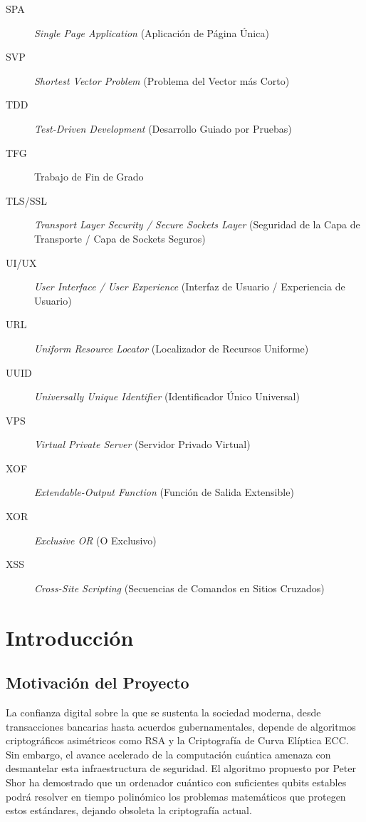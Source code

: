 \documentclass[11pt, a4paper]{report}
\theoremstyle{definition}
\begin{document}
\begin{description}
    \item[SPA] \textit{Single Page Application} (Aplicación de Página Única)
    \item[SVP] \textit{Shortest Vector Problem} (Problema del Vector más Corto)
    \item[TDD] \textit{Test-Driven Development} (Desarrollo Guiado por Pruebas)
    \item[TFG] Trabajo de Fin de Grado
    \item[TLS/SSL] \textit{Transport Layer Security / Secure Sockets Layer} (Seguridad de la Capa de Transporte / Capa de Sockets Seguros)
    \item[UI/UX] \textit{User Interface / User Experience} (Interfaz de Usuario / Experiencia de Usuario)
    \item[URL] \textit{Uniform Resource Locator} (Localizador de Recursos Uniforme)
    \item[UUID] \textit{Universally Unique Identifier} (Identificador Único Universal)
    \item[VPS] \textit{Virtual Private Server} (Servidor Privado Virtual)
    \item[XOF] \textit{Extendable-Output Function} (Función de Salida Extensible)
    \item[XOR] \textit{Exclusive OR} (O Exclusivo)
    \item[XSS] \textit{Cross-Site Scripting} (Secuencias de Comandos en Sitios Cruzados)
\end{description}



\newpage

\chapter{Introducción}

\section{Motivación del Proyecto}

La confianza digital sobre la que se sustenta la sociedad moderna, desde transacciones bancarias hasta acuerdos gubernamentales, depende de algoritmos criptográficos asimétricos como RSA y la Criptografía de Curva Elíptica ECC. Sin embargo, el avance acelerado de la computación cuántica amenaza con desmantelar esta infraestructura de seguridad. El algoritmo propuesto por Peter Shor ha demostrado que un ordenador cuántico con suficientes qubits estables podrá resolver en tiempo polinómico los problemas matemáticos que protegen estos estándares, dejando obsoleta la criptografía actual.
\end{document}
